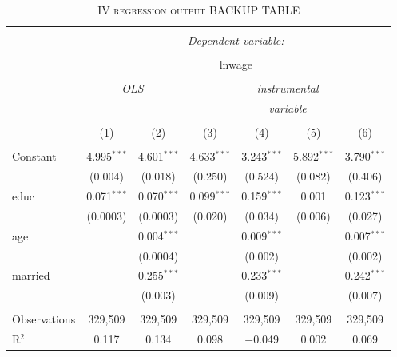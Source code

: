 \documentclass[a4paper]{article}
\begin{document}
\begin{table}[!htbp] \centering 
\begin{adjustwidth}{0.cm}{-0cm}
\begin{threeparttable}
\small
\captionsetup{font=small, justification=raggedright,singlelinecheck=false}
\caption{\textsc{IV regression output BACKUP TABLE}}
\centering 
  \label{}
\small 
\begin{tabular}{@{\extracolsep{-2pt}}lcccccc} 
\\[-5.8ex]\hline 
\hline \\[-1.8ex] 
 & \multicolumn{6}{c}{\textit{Dependent variable:}} \\ 
\cline{2-7} 
\\[-1.8ex] & \multicolumn{6}{c}{lnwage} \\ 
\\[-1.8ex] & \multicolumn{2}{c}{\textit{OLS}} & \multicolumn{4}{c}{\textit{instrumental}} \\ 
 & \multicolumn{2}{c}{\textit{}} & \multicolumn{4}{c}{\textit{variable}} \\ 
\\[-1.8ex] & (1) & (2) & (3) & (4) & (5) & (6)\\ 
\hline \\[-1.8ex] 
 Constant & 4.995$^{***}$ & 4.601$^{***}$ & 4.633$^{***}$ & 3.243$^{***}$ & 5.892$^{***}$ & 3.790$^{***}$ \\ 
  & (0.004) & (0.018) & (0.250) & (0.524) & (0.082) & (0.406) \\ 
  educ & 0.071$^{***}$ & 0.070$^{***}$ & 0.099$^{***}$ & 0.159$^{***}$ & 0.001 & 0.123$^{***}$ \\ 
  & (0.0003) & (0.0003) & (0.020) & (0.034) & (0.006) & (0.027) \\ 
  age &  & 0.004$^{***}$ &  & 0.009$^{***}$ &  & 0.007$^{***}$ \\ 
  &  & (0.0004) &  & (0.002) &  & (0.002) \\ 
  married &  & 0.255$^{***}$ &  & 0.233$^{***}$ &  & 0.242$^{***}$ \\ 
  &  & (0.003) &  & (0.009) &  & (0.007) \\ 
 \hline \\[-1.8ex] 
Observations & 329,509 & 329,509 & 329,509 & 329,509 & 329,509 & 329,509 \\ 
R$^{2}$ & 0.117 & 0.134 & 0.098 & $-$0.049 & 0.002 & 0.069 \\ 

\end{tabular}
\end{threeparttable}
\end{adjustwidth}
\end{table}
\end{document}
